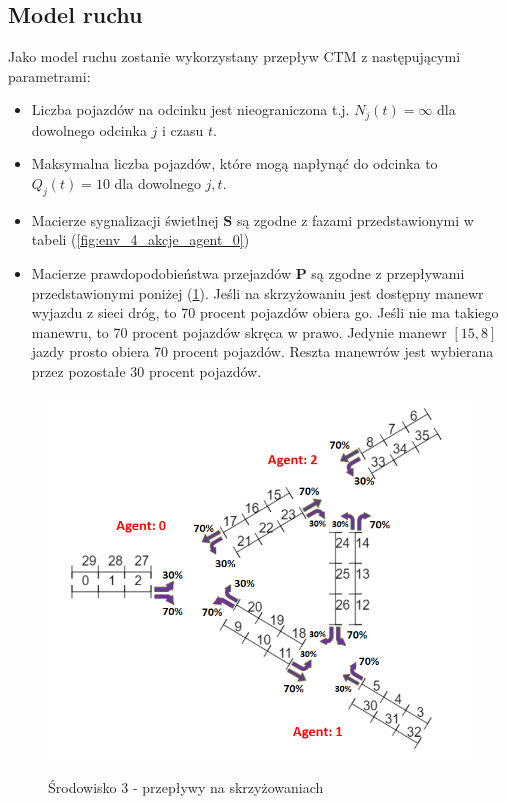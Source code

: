 \documentclass[12pt]{book}
\theoremstyle{plain}
\newcommand{\myref}[1]{(\ref{#1})}
\begin{document}
\subsection{Model ruchu}
Jako model ruchu zostanie wykorzystany przepływ CTM z następującymi parametrami:
\begin{itemize}
	\item Liczba pojazdów na odcinku jest nieograniczona t.j. $N_j(t)=\infty$ dla dowolnego odcinka $j$ i czasu $t$.
	\item Maksymalna liczba pojazdów, które mogą napłynąć do odcinka to $Q_j(t)=10$ dla dowolnego $j,t$.
	\item Macierze sygnalizacji świetlnej $\textbf{S}$ są zgodne z fazami przedstawionymi w tabeli \myref{fig:env_4_akcje_agent_0}
	\item Macierze prawdopodobieństwa przejazdów $\textbf{P}$ są zgodne z przepływami przedstawionymi poniżej \myref{fig:srodowisko_3_przeplywy}. Jeśli na skrzyżowaniu jest dostępny manewr wyjazdu z sieci dróg, to 70 procent pojazdów obiera go. Jeśli nie ma takiego manewru, to 70 procent pojazdów skręca w prawo. Jedynie manewr $[15,8]$ jazdy prosto obiera 70 procent pojazdów. Reszta manewrów jest wybierana przez pozostałe 30 procent pojazdów. 
\end{itemize}
\begin{figure}[H]
	\centering
	\includegraphics[width=14cm]{images/srodowisko_3_przeplywy}
	\label{fig:srodowisko_3_przeplywy}
	\caption{Środowisko 3 - przepływy na skrzyżowaniach}
\end{figure}
\end{document}
